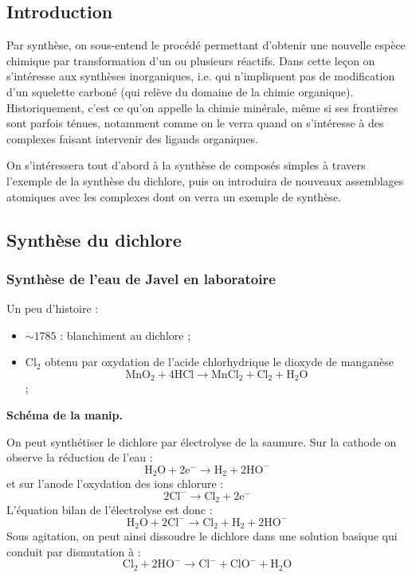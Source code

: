 \subsection*{Introduction}

Par synthèse, on sous-entend le procédé permettant d'obtenir une nouvelle espèce chimique par transformation d'un ou plusieurs réactifs. 
Dans cette leçon on s'intéresse aux synthèses inorganiques, i.e. qui n'impliquent pas de modification d'un squelette carboné (qui relève du domaine de la chimie organique).
Historiquement, c'est ce qu'on appelle la chimie minérale, même si ses frontières sont parfois ténues, notamment comme on le verra quand on s'intéresse à des complexes faisant intervenir des ligands organiques.

On s'intéressera tout d'abord à la synthèse de composés simples à travers l'exemple de la synthèse du dichlore, puis on introduira de nouveaux assemblages atomiques avec les complexes dont on verra un exemple de synthèse.

\subsection{Synthèse du dichlore}

\subsubsection{Synthèse de l'eau de Javel en laboratoire}

Un peu d'histoire :
\begin{itemize}
\item $\sim 1785$ : blanchiment au dichlore ;
\item $\mathrm{Cl_2}$ obtenu par oxydation de l'acide chlorhydrique le dioxyde de manganèse $$\mathrm{MnO_2 + 4HCl \rightarrow MnCl_2 + Cl_2 + H_2O}$$;
\end{itemize} 

\begin{slide}
\textbf{Schéma de la manip.}
\end{slide}

On peut synthétiser le dichlore par électrolyse de la saumure.
Sur la cathode on observe la réduction de l'eau :
\begin{equation*}
\mathrm{H_2O + 2e^- \rightarrow H_2 + 2HO^-}
\end{equation*}
et sur l'anode l'oxydation des ions chlorure :
\begin{equation*}
\mathrm{2Cl^- \rightarrow Cl_2 + 2e^-}
\end{equation*}
L'équation bilan de l'électrolyse est donc :
\begin{equation*}
\mathrm{H_2O + 2Cl^- \rightarrow Cl_2 + H_2 + 2HO^-}
\end{equation*}
Sous agitation, on peut ainsi dissoudre le dichlore dans une solution basique qui conduit par dismutation à :
\begin{equation*}
\mathrm{Cl_2 + 2HO^- \rightarrow Cl^- + ClO^- + H_2O} 
\end{equation*}

